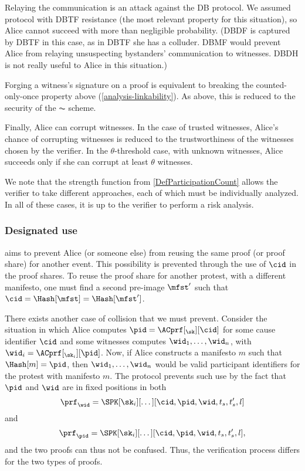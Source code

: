 Relaying the communication is an attack against the \ac{DB} protocol.
We assumed  protocol with \ac{DBTF} resistance (the most relevant 
property for this situation), so Alice cannot succeed with more than negligible 
probability.
(\Ac{DBDF} is captured by \ac{DBTF} in this case, as in \ac{DBTF} she has a 
colluder.
\Ac{DBMF} would prevent Alice from relaying unsuspecting bystanders' 
communication to witnesses.
\ac{DBDH} is not really useful to Alice in this situation.)
 
Forging a witness's signature on a proof is equivalent to breaking the 
counted-only-once property 
above (\cref{analysis-linkability}).
As above, this is reduced to the security of the \(\AC\) scheme.

Finally, Alice can corrupt witnesses.
In the case of trusted witnesses, Alice's chance of corrupting witnesses is 
reduced to the trustworthiness of the witnesses chosen by the verifier.
In the \(\theta\)-threshold case, with unknown witnesses, 
Alice succeeds only if she can corrupt at least \(\theta\) witnesses.

We note that the strength function from \cref{DefParticipationCount} allows the 
verifier to take different approaches, each of which must be individually 
analyzed.
In all of these cases, it is up to the verifier to perform a risk analysis.

\subsubsection{Designated use}%
\label{analysis-designated}

 aims to prevent Alice (or someone else) from reusing the 
same proof (or proof share) for another event.
This possibility is prevented through the use of \(\cid\) in the proof shares.
To reuse the proof share for another protest, with a different manifesto, one 
must find a second pre-image \(\mfst'\) such that \(\cid = \Hash[\mfst] = 
  \Hash[\mfst']\).

There exists another case of collision that we must prevent.
Consider the situation in which Alice computes \(\pid = \ACprf[_\sk][\cid]\) for some cause identifier \(\cid\) and some witnesses computes \(\wid_1, \dotsc, \wid_n\), with \(\wid_i = \ACprf[_{\sk_i}][\pid]\).
Now, if Alice constructs a manifesto \(m\) such that \(\Hash[m] = \pid\), then \(\wid_1, \dotsc, \wid_n\) would be valid participant identifiers for the protest with manifesto \(m\).
The protocol prevents such use by the fact that \(\pid\) and \(\wid\) are in 
fixed positions in both \[
  \prf_{\wid} = \SPK[\sk_i][\dotsc][\cid, \pid, \wid, t_s, t_s', l]
\] and \[
  \prf_{\pid} = \SPK[\sk_i][\dotsc][\cid, \pid, \wid, t_s, t_s', l],
\] and the two proofs can thus not be confused.
Thus, the verification process differs for the two types of proofs.

